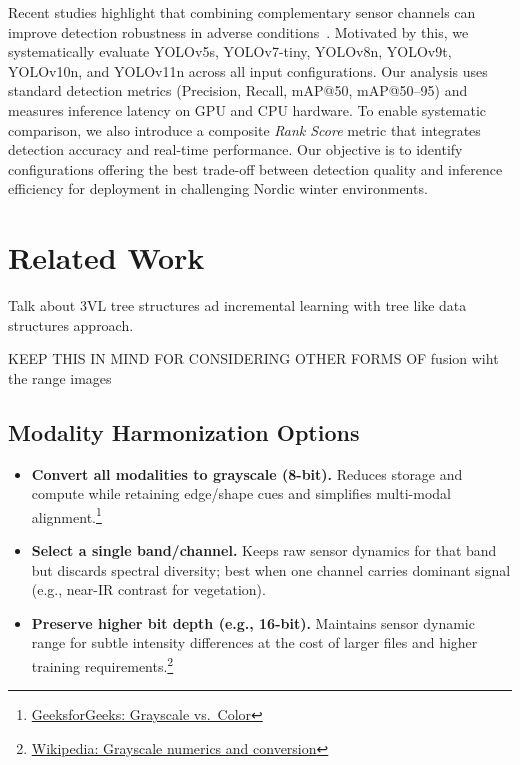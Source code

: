 \documentclass[runningheads]{llncs}
\begin{document}
Recent studies highlight that combining complementary sensor channels can improve detection robustness in adverse conditions~\cite{zafar2024realtime,nature2023fusion}. Motivated by this, we systematically evaluate YOLOv5s, YOLOv7-tiny, YOLOv8n, YOLOv9t, YOLOv10n, and YOLOv11n across all input configurations. Our analysis uses standard detection metrics (Precision, Recall, mAP@50, mAP@50--95) and measures inference latency on GPU and CPU hardware. To enable systematic comparison, we also introduce a composite \emph{Rank Score} metric that integrates detection accuracy and real-time performance. Our objective is to identify configurations offering the best trade-off between detection quality and inference efficiency for deployment in challenging Nordic winter environments.


\section{Related Work}

Talk about 3VL tree structures ad incremental learning with tree like data structures approach.



KEEP THIS IN MIND FOR CONSIDERING OTHER FORMS OF fusion wiht the range images
\subsection{Modality Harmonization Options}

\begin{itemize}
    \item \textbf{Convert all modalities to grayscale (8-bit).} Reduces storage and compute while retaining edge/shape cues and simplifies multi-modal alignment.\footnote{\href{https://www.geeksforgeeks.org/how-do-you-decide-whether-to-utilize-grayscale-or-colour-images-as-input-for-computer-vision-tasks/}{GeeksforGeeks: Grayscale vs.\ Color}}  
    \item \textbf{Select a single band/channel.} Keeps raw sensor dynamics for that band but discards spectral diversity; best when one channel carries dominant signal (e.g., near-IR contrast for vegetation).  
    \item \textbf{Preserve higher bit depth (e.g., 16-bit).} Maintains sensor dynamic range for subtle intensity differences at the cost of larger files and higher training requirements.\footnote{\href{https://en.wikipedia.org/wiki/Grayscale}{Wikipedia: Grayscale numerics and conversion}}  
\end{itemize}
\end{document}
